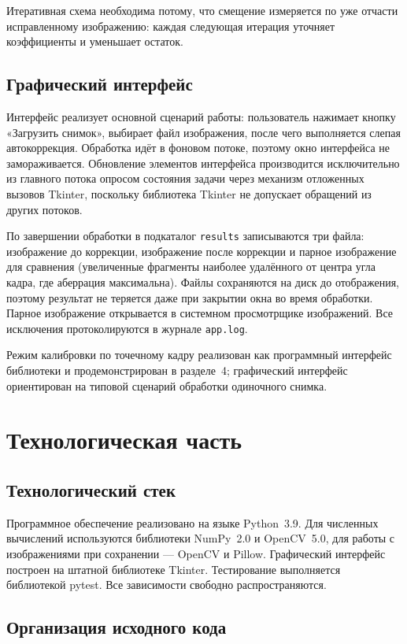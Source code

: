\documentclass[a4paper,14pt,oneside]{extreport}
\begin{document}
Итеративная схема необходима потому, что смещение измеряется по уже
отчасти исправленному изображению: каждая следующая итерация уточняет
коэффициенты и уменьшает остаток.

\subsection{Графический интерфейс}

Интерфейс реализует основной сценарий работы: пользователь нажимает
кнопку «Загрузить снимок», выбирает файл изображения, после чего
выполняется слепая автокоррекция. Обработка идёт в фоновом потоке, поэтому
окно интерфейса не замораживается. Обновление элементов интерфейса
производится исключительно из главного потока опросом состояния задачи
через механизм отложенных вызовов Tkinter, поскольку библиотека Tkinter
не допускает обращений из других потоков.

По завершении обработки в подкаталог \texttt{results} записываются три
файла: изображение до коррекции, изображение после коррекции и парное
изображение для сравнения (увеличенные фрагменты наиболее удалённого от
центра угла кадра, где аберрация максимальна). Файлы сохраняются на диск
до отображения, поэтому результат не теряется даже при закрытии окна во
время обработки. Парное изображение открывается в системном просмотрщике
изображений. Все исключения протоколируются в журнале \texttt{app.log}.

Режим калибровки по точечному кадру реализован как программный интерфейс
библиотеки и продемонстрирован в разделе~4; графический интерфейс
ориентирован на типовой сценарий обработки одиночного снимка.

\clearpage
\section{Технологическая часть}

\subsection{Технологический стек}

Программное обеспечение реализовано на языке Python~3.9. Для численных
вычислений используются библиотеки NumPy~2.0 и OpenCV~5.0, для работы с
изображениями при сохранении — OpenCV и Pillow. Графический интерфейс
построен на штатной библиотеке Tkinter. Тестирование выполняется
библиотекой pytest. Все зависимости свободно распространяются.

\subsection{Организация исходного кода}
\end{document}
